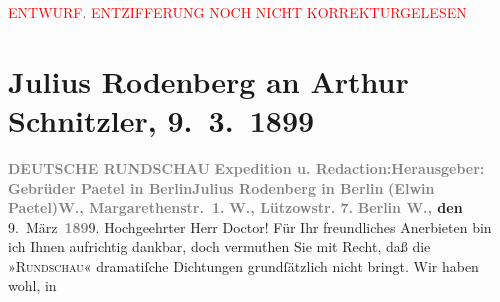 
\begin{center}
            \textcolor{red}{ENTWURF. ENTZIFFERUNG NOCH NICHT KORREKTURGELESEN}
                      \end{center}
            
               \section[Julius Rodenberg an Arthur Schnitzler, 9. 3. 1899]{ Julius Rodenberg an Arthur Schnitzler, 9. 3. 1899}\nopagebreak{}\rehead{ }\begin{ledgroupsized}[t]{13cm}\normalsize\beginnumbering{} \toendnotes[C]{\smallbreak\pagebreak[2]} 
\toendnotes[C]{\smallbreak}\pstart
           \noindent{}\centering{}{\pb}\textcolor{gray}{\textbf{DEUTSCHE RUNDSCHAU}}\pend
           \pstart
           \noindent{}\textcolor{gray}{\textbf{Expedition u. Redaction:}}\hfill \textcolor{gray}{\textbf{Herausgeber:}}\pend
           \pstart
           \textcolor{gray}{\textbf{Gebrüder Paetel in Berlin}}\hfill \textcolor{gray}{\textbf{Julius Rodenberg in Berlin}}\pend
           \pstart
           \textcolor{gray}{\textbf{(Elwin
                                Paetel)}}\hfill \textcolor{gray}{\textbf{W., Margarethenstr. 1.}}\pend
           \pstart
           \textcolor{gray}{\textbf{W., Lützowstr. 7.}}\pend
           \pstart
           \raggedleft{}\textbf{\textcolor{gray}{\textbf{Berlin W.,}} den}{ }9. März \textcolor{gray}{\textbf{189}}9.\pend
           \pstart{}Hochgeehrter Herr Doctor!\pend\pstart
           Für Ihr freundliches Anerbieten bin ich Ihnen aufrichtig dankbar, doch vermuthen
                    Sie mit Recht, daß die »\textsc{Rundschau}« dramatiſche Dichtungen grundſätzlich nicht bringt. Wir haben wohl, in

\end{ledgroupsized}

